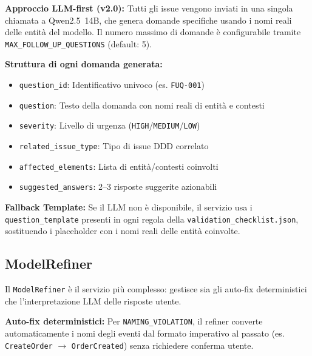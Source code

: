 \documentclass[12pt,a4paper]{report}
\begin{document}
\textbf{Approccio LLM-first (v2.0):} Tutti gli issue vengono inviati in una
singola chiamata a Qwen2.5~14B, che genera domande specifiche usando i nomi reali
delle entità del modello. Il numero massimo di domande è configurabile tramite
\texttt{MAX\_FOLLOW\_UP\_QUESTIONS} (default: 5).

\textbf{Struttura di ogni domanda generata:}
\begin{itemize}
  \item \texttt{question\_id}: Identificativo univoco (es. \texttt{FUQ-001})
  \item \texttt{question}: Testo della domanda con nomi reali di entità e contesti
  \item \texttt{severity}: Livello di urgenza (\texttt{HIGH}/\texttt{MEDIUM}/\texttt{LOW})
  \item \texttt{related\_issue\_type}: Tipo di issue DDD correlato
  \item \texttt{affected\_elements}: Lista di entità/contesti coinvolti
  \item \texttt{suggested\_answers}: 2--3 risposte suggerite azionabili
\end{itemize}

\textbf{Fallback Template:} Se il LLM non è disponibile, il servizio usa i
\texttt{question\_template} presenti in ogni regola della
\texttt{validation\_checklist.json}, sostituendo i placeholder con i nomi
reali delle entità coinvolte.

\subsection{ModelRefiner}
\label{sec:model-refiner-detail}

Il \texttt{ModelRefiner} è il servizio più complesso: gestisce sia gli auto-fix
deterministici che l'interpretazione LLM delle risposte utente.

\textbf{Auto-fix deterministici:} Per \texttt{NAMING\_VIOLATION}, il refiner
converte automaticamente i nomi degli eventi dal formato imperativo al passato
(es. \texttt{CreateOrder} $\rightarrow$ \texttt{OrderCreated}) senza richiedere
conferma utente.
\end{document}
